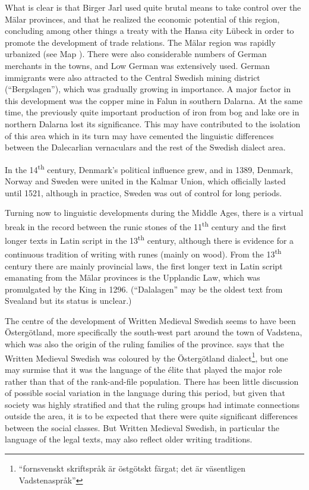 What is clear is that Birger Jarl used quite brutal means to take control over the Mälar provinces, and that he realized the economic potential of this region, concluding among other things a treaty with the Hansa city Lübeck in order to promote the development of trade relations. The Mälar region was rapidly urbanized (see Map ). There were also considerable numbers of German merchants in the towns, and Low German was extensively used. German immigrants were also attracted to the Central Swedish mining district (“Bergslagen”), which was gradually growing in importance. A major factor in this development was the copper mine in Falun in southern Dalarna. At the same time, the previously quite important production of iron from bog and lake ore in northern Dalarna lost its significance. This may have contributed to the isolation of this area which in its turn may have cemented the linguistic differences between the Dalecarlian vernaculars and the rest of the Swedish dialect area. 

In the 14\textsuperscript{th} century, Denmark’s political influence grew, and in 1389, Denmark, Norway and Sweden were united in the Kalmar Union, which officially lasted until 1521, although in practice, Sweden was out of control for long periods. 

Turning now to linguistic developments during the Middle Ages, there is a virtual break in the record between the runic stones of the 11\textsuperscript{th} century and the first longer texts in Latin script in the 13\textsuperscript{th} century, although there is evidence for a continuous tradition of writing with runes (mainly on wood). From the 13\textsuperscript{th} century there are mainly provincial laws, the first longer text in Latin script emanating from the Mälar provinces is the Upplandic Law, which was promulgated by the King in 1296. (“Dalalagen” may be the oldest text from Svealand but its status is unclear.) 

The centre of the development of Written Medieval Swedish seems to have been Östergötland, more specifically the south-west part around the town of Vadstena, which was also the origin of the ruling families of the province. \citet[53]{Wessén1966} says that the Written Medieval Swedish was coloured by the Östergötland dialect\footnote{ “fornsvenskt skriftspråk är östgötskt färgat; det är väsentligen Vadstenaspråk” }, but one may surmise that it was the language of the élite that played the major role rather than that of the rank-and-file population. There has been little discussion of possible social variation in the language during this period, but given that society was highly stratified and that the ruling groups had intimate connections outside the area, it is to be expected that there were quite significant differences between the social classes. But Written Medieval Swedish, in particular the language of the legal texts, may also reflect older writing traditions.

